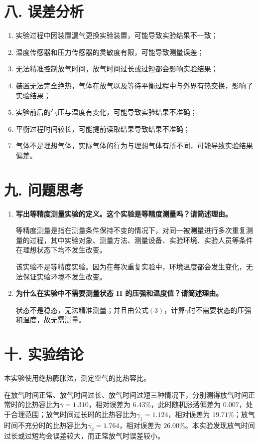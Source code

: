 \documentclass[12pt,a4paper]{article}
\begin{document}
	
	\section*{\textbf{八. 误差分析}}

	\begin{enumerate}
		\item 实验过程中因装置漏气更换实验装置，可能导致实验结果不一致；
		\item 温度传感器和压力传感器的灵敏度有限，可能导致测量误差；
		\item 无法精准控制放气时间，放气时间过长或过短都会影响实验结果；
		\item 装置无法完全绝热，气体在放气以及等待平衡过程中与外界有热交换，影响了实验结果；
		\item 实验前后的气压与温度有变化，可能导致实验结果不准确；
		\item 平衡过程时间较长，可能提前读取结果导致结果不准确；
		\item 气体不是理想气体，实际气体的行为与理想气体有所不同，可能导致实验结果偏差。
	\end{enumerate}

	\section*{\textbf{{九. 问题思考}}}

	\begin{enumerate}
		\item \textbf{写出等精度测量实验的定义。这个实验是等精度测量吗？请简述理由。}

		等精度测量是指在测量条件保持不变的情况下，对同一被测量进行多次重复测量的过程，其中实验对象、测量方法、测量设备、实验环境、实验人员等条件在理想状态下均不发生改变。
		
		该实验不是等精度实验。因为在每次重复实验中，环境温度都会发生变化，无法保证实验环境不发生改变。
		
		\item \textbf{为什么在实验中不需要测量状态 II 的压强和温度值？请简述理由。}
		
		状态\uppercase\expandafter{}不是稳态，无法精准测量；并且由公式$(3)$，计算$\gamma$时不需要状态\uppercase\expandafter{}的压强和温度，故无需测量。
		
	\end{enumerate}

	
	\section*{\textbf{{十. 实验结论}}}

	本实验使用绝热膨胀法，测定空气的比热容比。
	
	在放气时间正常、放气时间过长、放气时间过短三种情况下，分别测得放气时间正常时的比热容比为$\overline{\gamma}=1.310$，相对误差为 $6.43 \%$，此时随机涨落偏差为 $0.007$，处于合理范围；放气时间过长时的比热容比为$\overline{\gamma_1}=1.124$，相对误差为 $19.71 \%$；放气时间不充分时的比热容比为$\overline{\gamma_2}=1.764$，相对误差为 $26.00 \%$。本实验发现放气时间过长或过短均会误差较大，而正常放气时误差较小。
\end{document}
